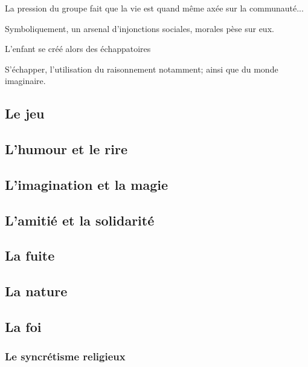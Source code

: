 \documentclass[a4paper, 11pt, hidelinks]{article}
\newcommand{\bs}{\bigskip}
\begin{document}
La pression du groupe fait que la vie est quand même axée sur la communauté...
\bs


Symboliquement, un arsenal d'injonctions sociales, morales pèse sur eux.
\bs


L'enfant se créé alors des échappatoires

S'échapper, l'utilisation du raisonnement notamment; ainsi que du monde imaginaire.



\subsection{Le jeu}



\subsection{L'humour et le rire}




\subsection{L'imagination et la magie}





\subsection{L'amitié et la solidarité}





\subsection{La fuite}





\subsection{La nature}







\subsection{La foi}


\subsubsection{Le syncrétisme religieux}
\end{document}
